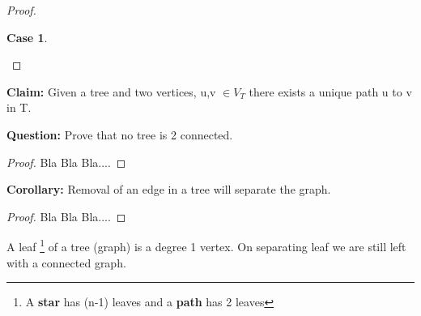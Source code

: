 \documentclass{article}
\newtheorem{case}{Case}
\begin{document}
\begin{proof}
\begin{case}
\begin{center}

\end{center}

    \end{case}
\end{proof}

\begin{text}
{\textbf{Claim:} Given a tree and two vertices, u,v $\in V_{T}$ there exists a unique path u to v in T.}   
\end{text}

\begin{text}
{\textbf {Question: }Prove that no tree is 2 connected.}
    \begin{proof}
        Bla Bla Bla....       
    \end{proof}
\end{text}
\begin{text}
{\textbf {Corollary: }Removal of an edge in a tree will separate the graph.}
    \begin{proof}
        Bla Bla Bla....       
    \end{proof}
\end{text}
\begin{definition}
A leaf \footnote{A \textbf{star} has (n-1) leaves and a \textbf{path} has 2 leaves} of a tree (graph) is a degree 1 vertex. On separating leaf we are still left with a connected graph.
\end{definition}
\end{document}
